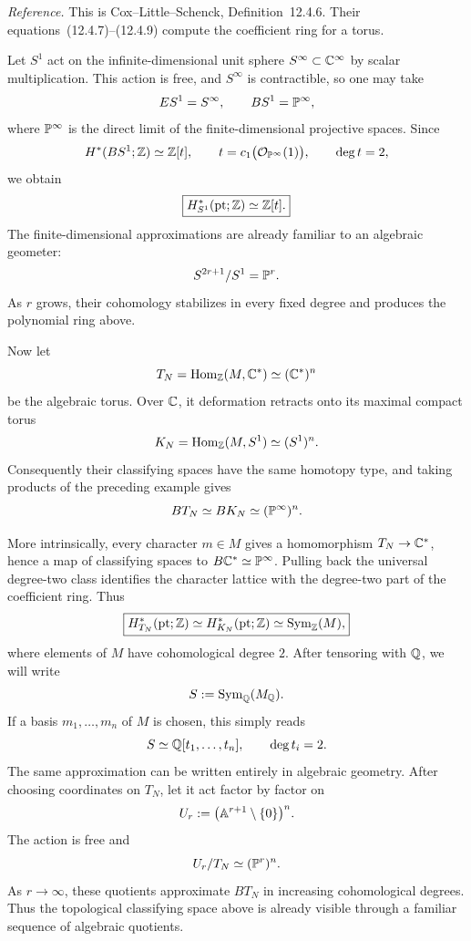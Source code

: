 \noindent
\textit{Reference.}
This is Cox--Little--Schenck, Definition~12.4.6. Their
equations~(12.4.7)--(12.4.9) compute the coefficient ring for a torus.

\begin{example}
\label{ex:bs1-equivariant-point}
Let \(S^1\) act on the infinite-dimensional unit sphere
\(S^\infty\subset\mathbb{C}^\infty\) by scalar multiplication.  This action
is free, and \(S^\infty\) is contractible, so one may take
\[
ES^1=S^\infty,
\qquad
BS^1=\mathbb{P}^\infty,
\]
where \(\mathbb{P}^\infty\) is the direct limit of the finite-dimensional
projective spaces.  Since
\[
H^*(BS^1;\mathbb{Z})\simeq\mathbb{Z}[t],
\qquad
t=c_1\bigl(\mathcal O_{\mathbb{P}^\infty}(1)\bigr),
\qquad
\deg t=2,
\]
we obtain
\[
\boxed{H_{S^1}^*(\mathrm{pt};\mathbb{Z})\simeq\mathbb{Z}[t].}
\]
The finite-dimensional approximations are already familiar to an
algebraic geometer:
\[
S^{2r+1}/S^1=\mathbb{P}^r.
\]
As \(r\) grows, their cohomology stabilizes in every fixed degree and
produces the polynomial ring above.
\end{example}

\begin{example}
\label{ex:algebraic-torus-equivariant-point}
Now let
\[
T_N=\operatorname{Hom}_{\mathbb{Z}}(M,\mathbb{C}^*)\simeq(\mathbb{C}^*)^n
\]
be the algebraic torus.  Over \(\mathbb{C}\), it deformation retracts onto its
maximal compact torus
\[
K_N=\operatorname{Hom}_{\mathbb{Z}}(M,S^1)\simeq(S^1)^n.
\]
Consequently their classifying spaces have the same homotopy type, and
taking products of the preceding example gives
\[
BT_N\simeq BK_N\simeq(\mathbb{P}^\infty)^n.
\]

More intrinsically, every character \(m\in M\) gives a homomorphism
\(T_N\to\mathbb{C}^*\), hence a map of classifying spaces to
\(B\mathbb{C}^*\simeq\mathbb{P}^\infty\).  Pulling back the universal degree-two
class identifies the character lattice with the degree-two part of the
coefficient ring.  Thus
\[
\boxed{
H_{T_N}^*(\mathrm{pt};\mathbb{Z})
\simeq
H_{K_N}^*(\mathrm{pt};\mathbb{Z})
\simeq
\operatorname{Sym}_{\mathbb{Z}}(M),
}
\]
where elements of \(M\) have cohomological degree \(2\).  After
tensoring with \(\mathbb{Q}\), we will write
\[
S:=\operatorname{Sym}_{\mathbb{Q}}(M_{\mathbb{Q}}).
\]
If a basis \(m_1,\ldots,m_n\) of \(M\) is chosen, this simply reads
\[
S\simeq\mathbb{Q}[t_1,\ldots,t_n],
\qquad \deg t_i=2.
\]
The same approximation can be written entirely in algebraic geometry.
After choosing coordinates on \(T_N\), let it act factor by factor on
\[
U_r:=\bigl(\mathbb{A}^{r+1}\setminus\{0\}\bigr)^n.
\]
The action is free and
\[
U_r/T_N\simeq(\mathbb{P}^r)^n.
\]
As \(r\to\infty\), these quotients approximate \(BT_N\) in increasing
cohomological degrees.  Thus the topological classifying space above
is already visible through a familiar sequence of algebraic quotients.
\end{example}


